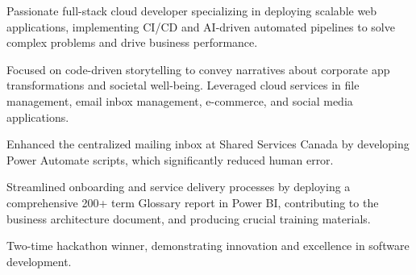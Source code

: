 

\begin{cvparagraph}
\begin{cventries}
{
\begin{cvitems}
    \item {Passionate full-stack cloud developer specializing in deploying scalable web applications, implementing CI/CD and AI-driven automated pipelines to solve complex problems and drive business performance.}
    \item {Focused on code-driven storytelling to convey narratives about corporate app transformations and societal well-being. Leveraged cloud services in file management, email inbox management, e-commerce, and social media applications.}
    \item {Enhanced the centralized mailing inbox at Shared Services Canada by developing Power Automate scripts, which significantly reduced human error.}
    \item {Streamlined onboarding and service delivery processes by deploying a comprehensive 200+ term Glossary report in Power BI, contributing to the business architecture document, and producing crucial training materials.}
    \item {Two-time hackathon winner, demonstrating innovation and excellence in software development.}
  \end{cvitems}
}
\end{cventries}
\end{cvparagraph}
